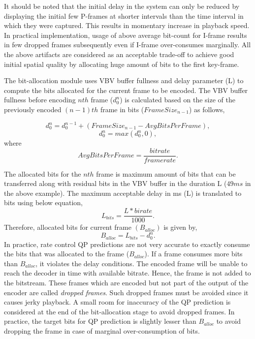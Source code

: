 \documentclass[11pt]{article} %
\begin{document}
It should be noted that the initial delay in the system can only be reduced by displaying the initial few P-frames at shorter intervals than the time interval in which they were captured. This results in momentary increase in playback speed. In practical implementation, usage of above average bit-count for I-frame results in few dropped frames subsequently even if I-frame over-consumes marginally. All the above artifacts are considered as an acceptable trade-off to achieve good initial spatial quality by allocating huge amount of bits to the first key-frame.

The bit-allocation module uses VBV buffer fullness and delay parameter (L) to compute the bits allocated for the current frame to be encoded. The VBV buffer fullness before encoding $nth$ frame ($d_0^{n}$) is calculated based on the size of the previously encoded $(n-1)th$ frame in bits ($FrameSize_{n-1}$) as follows,

\begin{equation}
\label{Eq:Frame level bit error accumulation}
d_0^{n} = d_0^{n-1} + (FrameSize_{n-1} - AvgBitsPerFrame),
\end{equation}
$$ d_0^{n} = max(d_0^{n} , 0), $$
where $$ AvgBitsPerFrame = \frac{bitrate}{framerate}.$$

The allocated bits for the $nth$ frame is maximum amount of bits that can be transferred along with residual bits in the VBV buffer in the duration L ($49ms$ in the above example). The maximum acceptable delay in ms (L) is translated to bits using below equation,
$$ L_{bits} = \frac{L * birate}{1000}.$$
Therefore, allocated bits for current frame $(B_{alloc})$ is given by,
\begin{equation}
	\label{Eq:bit-allocation}
	B_{alloc} = L_{bits} - d_0^n .
\end{equation}
In practice, rate control QP predictions are not very accurate to exactly consume the bits that was allocated to the frame ($B_{alloc}$). If a frame consumes more bits than $B_{alloc}$, it violates the delay conditions. The encoded frame will be unable to reach the decoder in time with available bitrate. Hence, the frame is not added to the bitstream. These frames which are encoded but not part of the output of the encoder are called \textit{dropped frames}. Such dropped frames must be avoided since it causes jerky playback. A small room for inaccuracy of the QP prediction is considered at the end of the bit-allocation stage to avoid dropped frames. In practice, the target bits for QP prediction is slightly lesser than $B_{alloc}$ to avoid dropping the frame in case of marginal over-consumption of bits.
\end{document}
